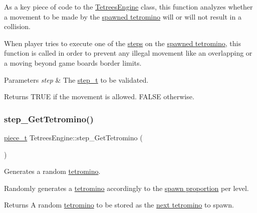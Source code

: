 As a key piece of code to the \hyperlink{classTetreesEngine}{Tetrees\+Engine} class, this function analyzes whether a movement to be made by the \hyperlink{classTetreesEngine_a26435ee2f02d9ba70d9e359745114f6e}{spawned tetromino} will or will not result in a collision.

When player tries to execute one of the \hyperlink{TetreesDefs_8hpp_a4d5a793092a473f85b4c1f7faf62afed}{steps} on the \hyperlink{classTetreesEngine_a26435ee2f02d9ba70d9e359745114f6e}{spawned tetromino}, this function is called in order to prevent any illegal movement like an overlapping or a moving beyond game board\textquotesingle{}s border limits. 
\begin{DoxyParams}{Parameters}
{\em step} & The \hyperlink{TetreesDefs_8hpp_a4d5a793092a473f85b4c1f7faf62afed}{step\+\_\+t} to be validated. \\
\hline
\end{DoxyParams}
\begin{DoxyReturn}{Returns}
{\ttfamily T\+R\+UE} if the movement is allowed. {\ttfamily F\+A\+L\+SE} otherwise. 
\end{DoxyReturn}
\mbox{\label{classTetreesEngine_a94d5fd25eec05994f02bb514496ec66d}} 
\subsubsection{\texorpdfstring{step\+\_\+\+Get\+Tetromino()}{step\_GetTetromino()}}
{\footnotesize\ttfamily \hyperlink{structpiece__t}{piece\+\_\+t} Tetrees\+Engine\+::step\+\_\+\+Get\+Tetromino (\begin{DoxyParamCaption}{ }\end{DoxyParamCaption})\hspace{0.3cm}{\ttfamily [private]}}



Generates a random \hyperlink{TetreesDefs_8hpp_adf4f8e2cbbd7d8894fe3beda39db1b8f}{tetromino}. 

Randomly generates a \hyperlink{TetreesDefs_8hpp_adf4f8e2cbbd7d8894fe3beda39db1b8f}{tetromino} accordingly to the \hyperlink{TetreesDefs_8hpp_t_prop}{spawn proportion} per level. \begin{DoxyReturn}{Returns}
A random \hyperlink{TetreesDefs_8hpp_adf4f8e2cbbd7d8894fe3beda39db1b8f}{tetromino} to be stored as the \hyperlink{classTetreesEngine_a44c902481f5d8a72ca8a78d24f5c3a33}{next tetromino} to spawn. 
\end{DoxyReturn}
\mbox{\label{classTetreesEngine_a270b227c9dfbfb72513c6cdfdd910d1b}} 
